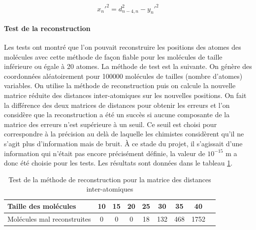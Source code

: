 \begin{equation}
		x_n'^2 = d_{n-4,n}^2 - y_n'^2
		\label{eq_opti}
\end{equation}


\paragraph{Test de la reconstruction}
Les tests ont montré que l'on pouvait reconstruire les positions des atomes des molécules avec cette méthode de façon fiable pour les molécules de taille inférieure ou égale à 20 atomes. La méthode de test est la suivante. On génère des coordonnées aléatoirement pour 100000 molécules de tailles (nombre d'atomes) variables. On utilise la méthode de reconstruction puis on calcule la nouvelle matrice réduite des distances inter-atomiques sur les nouvelles positions. On fait la différence des deux matrices de distances pour obtenir les erreurs et l'on considère que la reconstruction a été un succès si aucune composante de la matrice des erreurs n'est supérieure à un seuil. Ce seuil est choisi pour correspondre à la précision au delà de laquelle les chimistes considèrent qu'il ne s'agit plus d'information mais de bruit. À ce stade du projet, il s'agissait d'une information qui n'était pas encore précisément définie, la valeur de $10^{-15}$ m a donc été choisie pour les tests. Les résultats sont données dans le tableau \ref{tableau_test}.

\begin{table}
	\centering
	
	\begin{tabular}{|l|c|c|c|c|c|c|c|c|}
		\hline
		Taille des molécules & 10 & 15 & 20 & 25 & 30 & 35 & 40 \\ \hline
		Molécules mal reconstruites & 0 & 0 & 0 & 18 & 132 & 468 & 1752\\ \hline
	
	\end{tabular}

	\caption{Test de la méthode de reconstruction pour la matrice des distances inter-atomiques}
	\label{tableau_test}
\end{table}